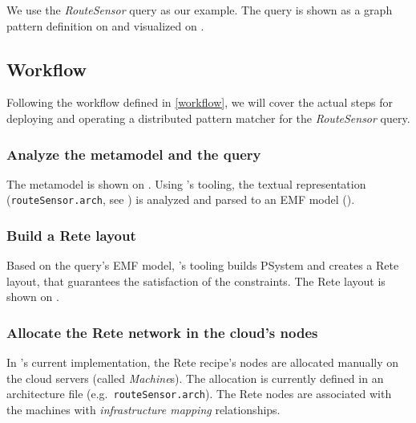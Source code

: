 
We use the \textit{RouteSensor} query as our example. The query is shown as a graph pattern definition on  and visualized on .

\subsection{Workflow}

Following the workflow defined in \autoref{workflow}, we will cover the actual steps for deploying and operating a distributed pattern matcher for the \textit{RouteSensor} query.


\subsubsection{Analyze the metamodel and the query}

The metamodel is shown on . Using \eiq{}'s tooling, the textual representation (\texttt{routeSensor.arch}, see ) is analyzed and parsed to an EMF model ().


\subsubsection{Build a Rete layout}

Based on the query's EMF model, \eiq{}'s tooling builds PSystem and creates a Rete layout, that guarantees the satisfaction of the constraints. The Rete layout is shown on . 

\subsubsection{Allocate the Rete network in the cloud's nodes} 

In \iqd{}'s current implementation, the Rete recipe's nodes are allocated manually on the cloud servers (called \textit{Machine}s). The allocation is currently defined in an architecture file (e.g.\ \texttt{routeSensor.arch}). The Rete nodes are associated with the machines with \textit{infrastructure mapping} relationships.


